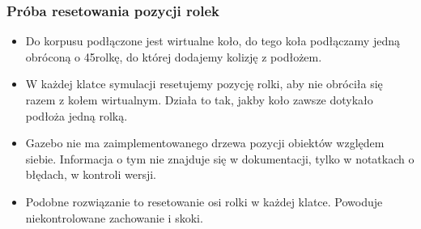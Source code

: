 \documentclass{beamer}
\begin{document}
	\begin{frame}
		\frametitle{Próba resetowania pozycji rolek}
		\begin{itemize}
		\item Do korpusu podłączone jest wirtualne koło, do tego koła podłączamy jedną obróconą o 45\textdegree rolkę, do której dodajemy kolizję z podłożem.
		\item W każdej klatce symulacji resetujemy pozycję rolki, aby nie obróciła się razem z kołem wirtualnym.
		Działa to tak, jakby koło zawsze dotykało podłoża jedną rolką.
		\item Gazebo nie ma zaimplementowanego drzewa pozycji obiektów względem siebie. 
		Informacja o tym nie znajduje się w dokumentacji, tylko w notatkach o błędach, w kontroli wersji.
		\item Podobne rozwiązanie to resetowanie osi rolki w każdej klatce. Powoduje niekontrolowane zachowanie i skoki.
		\end{itemize}
	\end{frame}
\end{document}
